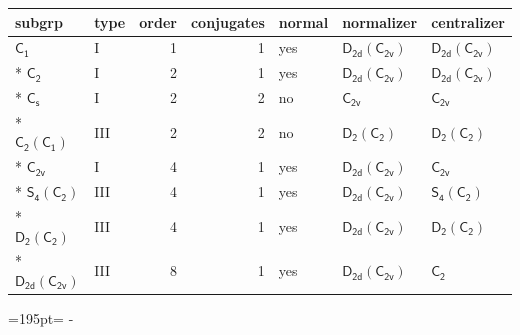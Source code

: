 \documentclass[10pt,a4paper]{article}
\newcommand{\needspace}[1]{\par\penalty-100\begingroup\dimen0=#1\relax\dimen2=\pagegoal
  \advance\dimen2-\pagetotal\ifdim\dimen0>\dimen2\relax\ifdim\dimen2>0pt\vfil\break\fi\fi
  \endgroup}
\numberwithin{equation}{section}
\newcommand{\grp}[1]{\mathsf{#1}}
\begin{document}
{\small\begin{longtable}{@{}llrrlll@{}}\toprule
subgrp & type & order & conjugates & normal & normalizer & centralizer\\\midrule\endhead
\bottomrule\endfoot\endlastfoot
\href{../../../rotation/data/pdf/C1.pdf}{$\grp{C_{1}}$} & I & 1 & 1 & yes & \href{D2d-C2v.pdf}{$\grp{D_{2d}}(\grp{C_{2v}})$} & \href{D2d-C2v.pdf}{$\grp{D_{2d}}(\grp{C_{2v}})$}\\*
\href{../../../rotation/data/pdf/C2.pdf}{$\grp{C_{2}}$} & I & 2 & 1 & yes & \href{D2d-C2v.pdf}{$\grp{D_{2d}}(\grp{C_{2v}})$} & \href{D2d-C2v.pdf}{$\grp{D_{2d}}(\grp{C_{2v}})$}\\*
\href{../../../rotation/data/pdf/C1v.pdf}{$\grp{C_{s}}$} & I & 2 & 2 & no & \href{../../../rotation/data/pdf/C2v.pdf}{$\grp{C_{2v}}$} & \href{../../../rotation/data/pdf/C2v.pdf}{$\grp{C_{2v}}$}\\*
\href{C2-C1.pdf}{$\grp{C_{2}}(\grp{C_{1}})$} & III & 2 & 2 & no & \href{D2-C2.pdf}{$\grp{D_{2}}(\grp{C_{2}})$} & \href{D2-C2.pdf}{$\grp{D_{2}}(\grp{C_{2}})$}\\*
\href{../../../rotation/data/pdf/C2v.pdf}{$\grp{C_{2v}}$} & I & 4 & 1 & yes & \href{D2d-C2v.pdf}{$\grp{D_{2d}}(\grp{C_{2v}})$} & \href{../../../rotation/data/pdf/C2v.pdf}{$\grp{C_{2v}}$}\\*
\href{S4-C2.pdf}{$\grp{S_{4}}(\grp{C_{2}})$} & III & 4 & 1 & yes & \href{D2d-C2v.pdf}{$\grp{D_{2d}}(\grp{C_{2v}})$} & \href{S4-C2.pdf}{$\grp{S_{4}}(\grp{C_{2}})$}\\*
\href{D2-C2.pdf}{$\grp{D_{2}}(\grp{C_{2}})$} & III & 4 & 1 & yes & \href{D2d-C2v.pdf}{$\grp{D_{2d}}(\grp{C_{2v}})$} & \href{D2-C2.pdf}{$\grp{D_{2}}(\grp{C_{2}})$}\\*
\href{D2d-C2v.pdf}{$\grp{D_{2d}}(\grp{C_{2v}})$} & III & 8 & 1 & yes & \href{D2d-C2v.pdf}{$\grp{D_{2d}}(\grp{C_{2v}})$} & \href{../../../rotation/data/pdf/C2.pdf}{$\grp{C_{2}}$}\\
\bottomrule\end{longtable}}
\needspace{195pt}
\end{document}
